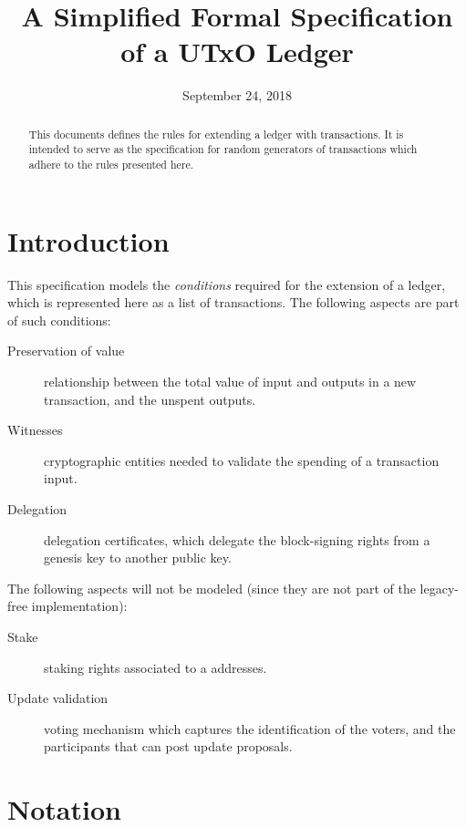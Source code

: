\documentclass[11pt,a4paper]{article}
\begin{document}
\title{A Simplified Formal Specification of a UTxO Ledger}

\author{}

\date{September 24, 2018}

\maketitle

\begin{abstract}
This documents defines the rules for extending a ledger with transactions. It
is intended to serve as the specification for random generators of transactions
which adhere to the rules presented here.
\end{abstract}

\tableofcontents
\listoffigures

\section{Introduction}
\label{sec:introduction}

This specification models the \textit{conditions} required for the extension of
a ledger, which is represented here as a list of transactions. The following
aspects are part of such conditions:

\begin{description}
\item[Preservation of value] relationship between the total value of input and outputs
  in a new transaction, and the unspent outputs.
\item[Witnesses] cryptographic entities needed to validate the spending
  of a transaction input.
\item[Delegation] delegation certificates, which delegate the block-signing
  rights from a genesis key to another public key.
\end{description}

The following aspects will not be modeled (since they are not part of the legacy-free
implementation):
\begin{description}
\item[Stake] staking rights associated to a addresses.
\item[Update validation] voting mechanism which captures the identification of
  the voters, and the participants that can post update proposals.
\end{description}

\section{Notation}\label{sec:notation}
\end{document}
